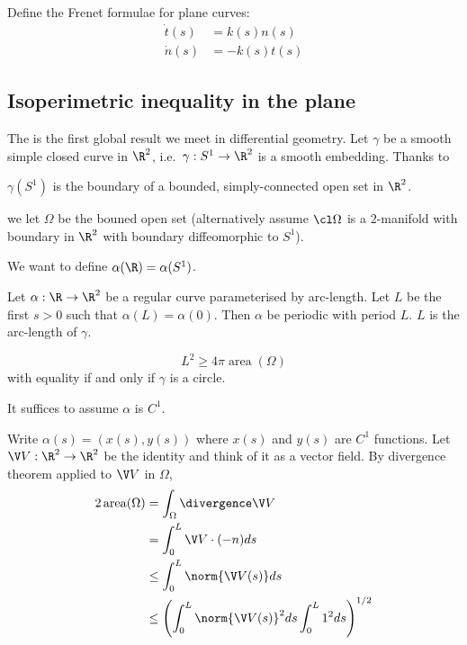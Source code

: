 \documentclass[a4paper]{article}
\begin{document}
\begin{ex}
  Define the Frenet formulae for plane curves:
  \begin{align*}
    \dot t(s) &= k(s)n(s) \\
    \dot n(s) &= -k(s)t(s)
  \end{align*}
\end{ex}

\subsection{Isoperimetric inequality in the plane}

The is the first global result we meet in differential geometry. Let \(\gamma\) be a smooth simple closed curve in \(\R^2\), i.e.\ \(\gamma: S^1 \to \R^2\) is a smooth embedding. Thanks to

\begin{theorem}
  \(\gamma(S^1)\) is the boundary of a bounded, simply-connected open set in \(\R^2\).
\end{theorem}
we let \(\Omega\) be the bouned open set (alternatively assume \(\cl \Omega\) is a \(2\)-manifold with boundary in \(\R^2\) with boundary diffeomorphic to \(S^1\)).

\begin{note}
  We want to define \(\alpha(\R) = \alpha(S^1)\).
  
  Let \(\alpha: \R \to \R^2\) be a regular curve parameterised by arc-length. Let \(L\) be the first \(s > 0\) such that \(\alpha(L) = \alpha(0)\). Then \(\alpha\) be periodic with period \(L\). \(L\) is the arc-length of \(\gamma\).
\end{note}

\begin{theorem}
  \[
    L^2 \geq 4\pi \operatorname{area}(\Omega)
  \]
  with equality if and only if \(\gamma\) is a circle.
\end{theorem}

\begin{remark}
  It suffices to assume \(\alpha\) is \(C^1\).
\end{remark}

Write \(\alpha(s) = (x(s), y(s))\) where \(x(s)\) and \(y(s)\) are \(C^1\) functions. Let \(\V V: \R^2 \to \R^2\) be the identity and think of it as a vector field. By divergence theorem applied to \(\V V\) in \(\Omega\),
\begin{align*}
  2 \operatorname{area}(\Omega)
  &= \int_\Omega \divergence \V V \\
  &= \int_0^L \V V \cdot (-n) ds \\
  &\leq \int_0^L \norm{\V V(s)} ds \\
  &\leq \left( \int_0^L \norm{\V V(s)}^2 ds \int_0^L 1^2 ds \right)^{1/2}
\end{align*}
\end{document}
